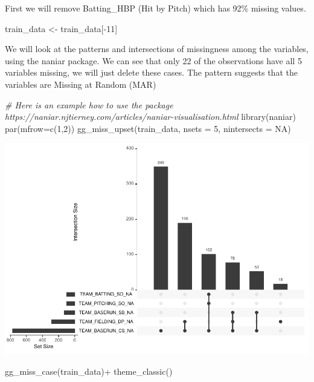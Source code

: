 \documentclass[
]{article}
\newenvironment{Shaded}{\begin{snugshade}}{\end{snugshade}}
\newcommand{\AttributeTok}[1]{\textcolor[rgb]{0.77,0.63,0.00}{#1}}
\newcommand{\CommentTok}[1]{\textcolor[rgb]{0.56,0.35,0.01}{\textit{#1}}}
\newcommand{\ConstantTok}[1]{\textcolor[rgb]{0.00,0.00,0.00}{#1}}
\newcommand{\DecValTok}[1]{\textcolor[rgb]{0.00,0.00,0.81}{#1}}
\newcommand{\FunctionTok}[1]{\textcolor[rgb]{0.00,0.00,0.00}{#1}}
\newcommand{\NormalTok}[1]{#1}
\newcommand{\OtherTok}[1]{\textcolor[rgb]{0.56,0.35,0.01}{#1}}
\newcommand{\SpecialCharTok}[1]{\textcolor[rgb]{0.00,0.00,0.00}{#1}}
\begin{document}
First we will remove Batting\_HBP (Hit by Pitch) which has 92\% missing
values.

\begin{Shaded}
\begin{Highlighting}[]
\NormalTok{train\_data }\OtherTok{\textless{}{-}}\NormalTok{ train\_data[}\SpecialCharTok{{-}}\DecValTok{11}\NormalTok{]}
\end{Highlighting}
\end{Shaded}

We will look at the patterns and intersections of missingness among the
variables, using the naniar package. We can see that only 22 of the
observations have all 5 variables missing, we will just delete these
cases. The pattern suggests that the variables are Missing at Random
(MAR)

\begin{Shaded}
\begin{Highlighting}[]
\CommentTok{\# Here is an example how to use the package https://naniar.njtierney.com/articles/naniar{-}visualisation.html}
\FunctionTok{library}\NormalTok{(naniar)}
\FunctionTok{par}\NormalTok{(}\AttributeTok{mfrow=}\FunctionTok{c}\NormalTok{(}\DecValTok{1}\NormalTok{,}\DecValTok{2}\NormalTok{))}
\FunctionTok{gg\_miss\_upset}\NormalTok{(train\_data, }
              \AttributeTok{nsets =} \DecValTok{5}\NormalTok{,}
              \AttributeTok{nintersects =} \ConstantTok{NA}\NormalTok{)}
\end{Highlighting}
\end{Shaded}

\includegraphics{Assignment1_files/figure-latex/unnamed-chunk-16-1.pdf}

\begin{Shaded}
\begin{Highlighting}[]
\FunctionTok{gg\_miss\_case}\NormalTok{(train\_data)}\SpecialCharTok{+}
  \FunctionTok{theme\_classic}\NormalTok{()}
\end{Highlighting}
\end{Shaded}
\end{document}
